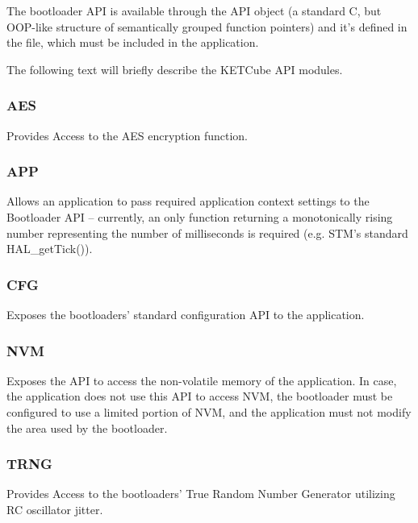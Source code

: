 The bootloader API is available through the API object (a standard C, but OOP-like structure of semantically grouped function pointers) and it's defined in the  file, which must be included in the application.


The following text will briefly describe the KETCube API modules.

\subsubsection*{AES}
Provides Access to the AES encryption function.

\subsubsection*{APP}
Allows an application to pass required application context settings to the Bootloader API 
-- currently, an only function returning a monotonically rising number representing the number of milliseconds is required (e.g. STM's standard HAL\_getTick()).

\subsubsection*{CFG}
Exposes the bootloaders' standard configuration API to the application.

\subsubsection*{NVM}
Exposes the API to access the non-volatile memory of the application.
In case, the application does not use this API to access NVM, 
the bootloader must be configured to use a limited portion of NVM,
and the application must not modify the area used by the bootloader.

\subsubsection*{TRNG}
Provides Access to the bootloaders' True Random Number Generator utilizing RC oscillator jitter.

